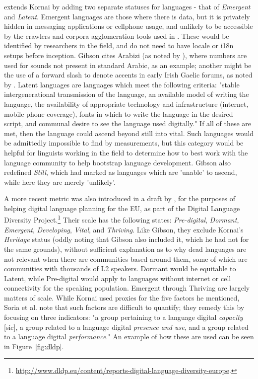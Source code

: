 \citet{gibson2016assessing} extends Kornai by adding two separate statuses for languages - that of {\it Emergent} and {\it Latent}. Emergent languages are those where there is data, but it is privately hidden in messaging applications or cellphone usage, and unlikely to be accessible by the crawlers and corpora agglomeration tools used in \citet{kornai2013digital}. These would be identified by researchers in the field, and do not need to have locale or i18n setups before inception. Gibson cites Arabizi (as noted by \citet{darwish2013arabizi}), where numbers are used for sounds not present in standard Arabic, as an example; another might be the use of a forward slash to denote accents in early Irish Gaelic forums, as noted by \citet{scannell2007crubadan}. Latent languages are languages which meet the following criteria: "stable intergenerational transmission of the language, an available model of writing the language, the availability of appropriate technology and infrastructure (internet, mobile phone coverage), fonts in which to write the language in the desired script, and communal desire to see the language used digitally." If all of these are met, then the language could ascend beyond still into vital. Such languages would be admittedly impossible to find by measurements, but this category would be helpful for linguists working in the field to determine how to best work with the language community to help bootstrap language development. Gibson also redefined {\it Still}, which \citet{kornai2013digital} had marked as languages which are 'unable' to ascend, while here they are merely 'unlikely'.

A more recent metric was also introduced in a draft by \citet{soria2017digital}, for the purposes of helping digital language planning for the EU, as part of the Digital Language Diversity Project.\footnote{\href{http://www.dldp.eu/content/reports-digital-language-diversity-europe}{http://www.dldp.eu/content/reports-digital-language-diversity-europe}. } Their scale has the following states: {\it Pre-digital}, {\it Dormant}, {\it Emergent}, {\it Developing}, {\it Vital}, and {\it Thriving}. Like Gibson, they exclude Kornai's {\it Heritage} status (oddly noting that Gibson also included it, which he had not for the same grounds), without sufficient explanation as to why dead languages are not relevant when there are communities based around them, some of which are communities with thousands of L2 speakers. %
Dormant would be equitable to Latent, while Pre-digital would apply to languages without internet or cell connectivity for the speaking population. Emergent through Thriving are largely matters of scale. While Kornai used proxies for the five factors he mentioned, Soria et al. note that such factors are difficult to quantify; they remedy this by focusing on three indicators: "a group pertaining to a language digital {\it capacity} [sic], a group related to a language digital {\it presence and use}, and a group related to a language digital {\it performance}." \citep[5]{soria2017digital} An example of how these are used can be seen in Figure~\ref{fig:dldp}.


